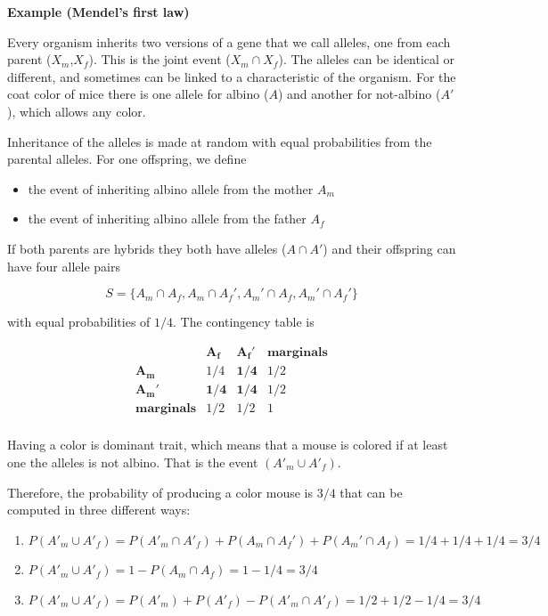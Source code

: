 \documentclass[
]{book}
\begin{document}
\textbf{Example (Mendel's first law)}

Every organism inherits two versions of a gene that we call alleles, one from each parent (\(X_m\),\(X_f\)). This is the joint event (\(X_m \cap X_f\)). The alleles can be identical or different, and sometimes can be linked to a characteristic of the organism. For the coat color of mice there is one allele for albino (\(A\)) and another for not-albino (\(A'\)), which allows any color.

Inheritance of the alleles is made at random with equal probabilities from the parental alleles. For one offspring, we define

\begin{itemize}
\item
  the event of inheriting albino allele from the mother \(A_m\)
\item
  the event of inheriting albino allele from the father \(A_f\)
\end{itemize}

If both parents are hybrids they both have alleles (\(A \cap A'\)) and their offspring can have four allele pairs

\[S =\{A_m \cap A_f,  A_m \cap A_f', A_m' \cap A_f, A_m' \cap A_f'\}\]

with equal probabilities of \(1/4\). The contingency table is

\[
\begin{array}{ccc|c}
                   & \mathbf{A_f}   & \mathbf{A_f'} & \mathbf{marginals} \\ 
\mathbf{A_m}       & 1/4   & \mathbf{1/4}  & 1/2                \\ 
\mathbf{A_m'}      & \mathbf{1/4}   & \mathbf{1/4}           & 1/2                 \\ \hline
\mathbf{marginals} & 1/2            & 1/2           & 1                   \\ 
\end{array}
\]

Having a color is dominant trait, which means that a mouse is colored if at least one the alleles is not albino. That is the event \((A'_m \cup A'_f)\).

Therefore, the probability of producing a color mouse is \(3/4\) that can be computed in three different ways:

\begin{enumerate}
\def\labelenumi{\arabic{enumi})}
\item
  \(P( A'_m \cup A'_f)=P(A'_m \cap A'_f)+P(A_m\cap A_f')+P(A_m'\cap A_f)=1/4+1/4+1/4=3/4\)
\item
  \(P(A'_m \cup A'_f)=1-P(A_m\cap A_f)= 1-1/4=3/4\)
\item
  \(P( A'_m \cup A'_f)=P(A'_m) + P(A'_f) - P(A'_m\cap A'_f)=1/2+1/2-1/4=3/4\)
\end{enumerate}
\end{document}
